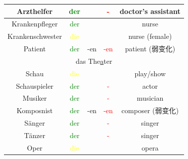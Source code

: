 \begin{center}
\begin{longtable} {|c|c|c|c|c|}
        Arzthelfer                      & \textcolor{green}{der}                         &                       & \textcolor{red}{-}                       & doctor's assistant      \\
        \hline
        Krankenpfleger                  & \textcolor{green}{der}                         &                       &                                          & nurse                   \\
        Krankenschwester                & \textcolor{yellow}{die}                        &                       &                                          & nurse (female)          \\
        \hline
        Patient                         & \textcolor{green}{der}                         & -en                   & \textcolor{red}{-en}                     & patient (弱变化)           \\
        \hline
        \multicolumn{5}{|c|}{das The\underline{a}ter}                                                                                                                                 \\
        \hline
        Schau                           & \textcolor{yellow}{die}                        &                       &                                          & play/show               \\
        Schauspieler                    & \textcolor{green}{der}                         &                       & \textcolor{red}{-}                       & actor                   \\
        Musiker                         & \textcolor{green}{der}                         &                       & \textcolor{red}{-}                       & musician                \\
        Komposnist                      & \textcolor{green}{der}                         & -en                   & \textcolor{red}{-en}                     & composer (弱变化)          \\
        Sänger                          & \textcolor{green}{der}                         &                       & \textcolor{red}{-}                       & singer                  \\
        Tänzer                          & \textcolor{green}{der}                         &                       & \textcolor{red}{-}                       & singer                  \\
        Oper                            & \textcolor{yellow}{die}                        &                       &                                          & opera                   \\

\end{longtable}
\end{center}
